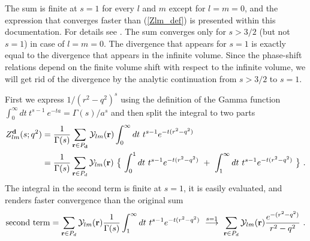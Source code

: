 \documentclass[a4paper,12pt]{book}
\begin{document}
The sum is finite at $s=1$ for every $l$ and $m$ except for $l=m=0$, and the expression that converges faster than (\ref{Zlm_def}) is presented within this documentation. For details see \cite{Leskovec:2012gb}. The sum converges only for $s>3/2$ (but not $s=1$) in case of $l=m=0$. The divergence that appears  for $s=1$  is  exactly equal to the divergence that appears in the infinite volume. Since the phase-shift relations depend on the finite volume shift with respect to the infinite volume, we will get rid of the divergence by the analytic continuation from $s>3/2$ to $s=1$. 

First we express $1/(r^2-q^2)^s$ using the definition of the Gamma function $\int_0^\infty dt~ t^{s-1}~e^{-ta}=\Gamma(s)/a^s$ and then split the integral to two parts
\begin{align}
\label{Zlm_1}
Z_{lm}^{\mathbf{d}}(s;q^2)&= \frac{1}{\Gamma(s)}\sum_{\mathbf{r}\in P_{\mathbf{d}}} {\cal Y}_{lm}(\mathbf{r}) \int _0^\infty dt~t^{s-1} e^{-t(r^2-q^2)} \nonumber \\
&=\frac{1}{\Gamma(s)}\sum_{\mathbf{r}\in P_{d}} {\cal Y}_{lm}(\mathbf{r})~\bigl\{~\int _0^1 dt~t^{s-1} e^{-t(r^2-q^2)}~+~\int _1^\infty dt~t^{s-1} e^{-t(r^2-q^2)}~\bigr\}\ .
\end{align}
The integral in the second term is finite at $s=1$, it is easily evaluated, and renders faster convergence than the original sum 
\begin{equation}
\label{second_term}
\mathrm{second\ term}=\sum_{\mathbf{r}\in P_{d}} {\cal Y}_{lm}(\mathbf{r}) \frac{1}{\Gamma(s)} \int _1^\infty dt~t^{s-1} e^{-t(r^2-q^2)} \ \stackrel {s=1}{ \longrightarrow} ~\sum_{\mathbf{r}\in P_{d}} {\cal Y}_{lm}(\mathbf{r}) \frac{e^{-(r^2-q^2)}}{r^2-q^2}\ .
\end{equation}
\end{document}
